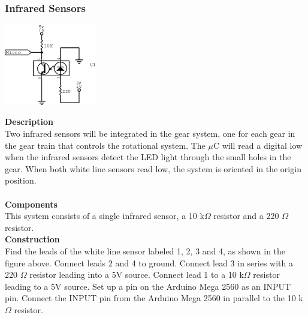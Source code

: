 \documentclass[titlepage]{article}
\begin{document}
\subsubsection{Infrared Sensors}
\begin{center}
	\includegraphics[width = 0.3\textwidth]{IRSensor.png}
\label{fig:IRSensorFig}
\end{center}
\textbf{Description}\\
Two infrared sensors will be integrated in the gear system, one for each gear in the gear train that controls the rotational system. The $\mu$C will read a digital low when the infrared sensors detect the LED light through the small holes in the gear. When both white line sensors read low, the system is oriented in the origin position.\\\\
\textbf{Components}\\
This system consists of a single infrared sensor, a 10 k$\Omega$ resistor and a 220 $\Omega$ resistor.\\
\textbf{Construction}\\
Find the leads of the white line sensor labeled 1, 2, 3 and 4, as shown in the figure above.  Connect leads 2 and 4 to ground. Connect lead 3 in series with a 220 $\Omega$ resistor leading into a 5V source. Connect lead 1 to a 10 k$\Omega$ resistor leading to a 5V source. Set up a pin on the Arduino Mega 2560 as an INPUT pin. Connect the INPUT pin from the Arduino Mega 2560 in parallel to the 10 k$\Omega$ resistor.
\end{document}
